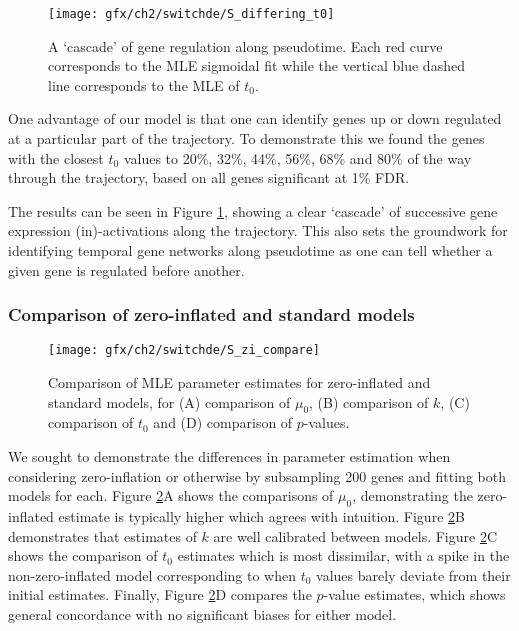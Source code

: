 \begin{figure}[h]%
\centering
\texttt{[image: gfx/ch2/switchde/S\_differing\_t0]}
\caption{A `cascade' of gene regulation along pseudotime. Each red curve corresponds to the MLE sigmoidal fit while the vertical blue dashed line corresponds to the MLE of $t_0$.}\label{fig:S3}
\end{figure}

One advantage of our model is that one can identify genes up or down regulated at a particular part of the trajectory. To demonstrate this we found the genes with the closest $t_0$ values to 20\%, 32\%, 44\%, 56\%, 68\% and 80\% of the way through the trajectory, based on all genes significant at 1\% FDR.

The results can be seen in Figure \ref{fig:S3}, showing a clear `cascade' of successive gene expression (in)-activations along the trajectory. This also sets the groundwork for identifying temporal gene networks along pseudotime as one can tell whether a given gene is regulated before another.


\subsubsection{Comparison of zero-inflated and standard models}

\begin{figure}[!h]%
\centering
\texttt{[image: gfx/ch2/switchde/S\_zi\_compare]}
\caption{Comparison of MLE parameter estimates for zero-inflated and standard models, for (A) comparison of $\mu_0$, (B) comparison of $k$, (C) comparison of $t_0$ and (D) comparison of $p$-values.}\label{fig:S4}
\end{figure}


We sought to demonstrate the differences in parameter estimation when considering zero-inflation or otherwise by subsampling 200 genes and fitting both models for each. Figure \ref{fig:S4}A shows the comparisons of $\mu_0$, demonstrating the zero-inflated estimate is typically higher which agrees with intuition. Figure \ref{fig:S4}B demonstrates that estimates of $k$ are well calibrated between models. Figure \ref{fig:S4}C shows the comparison of $t_0$ estimates which is most dissimilar, with a spike in the non-zero-inflated model corresponding to when $t_0$ values barely deviate from their initial estimates. Finally, Figure \ref{fig:S4}D compares the $p$-value estimates, which shows general concordance with no significant biases for either model.


